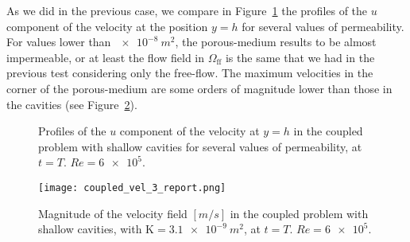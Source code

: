 As we did in the previous case, we compare in Figure~\ref{fig:md_wall_velocities} the profiles of the $u$ component of the velocity at the position $y=h$ for several values of permeability. For values lower than $\SI{e-8}{m^2}$, the porous-medium results to be almost impermeable, or at least the flow field in $\Omega_\text{ff}$ is the 
same that we had in the previous test considering only the free-flow. The maximum velocities in the 
corner of the porous-medium are some orders of magnitude lower than those in 
the cavities (see Figure~\ref{fig:coupled_vel_3}).
\begin{figure}
	\centering
	
	\caption[Profiles of the $u$ component of the velocity at $y=h$ in the coupled problem with shallow cavities]{Profiles of the $u$ component of the velocity at $y=h$ in the coupled problem with shallow cavities for several values of permeability, at $t=T$. $Re = \num{6e5}$.}
	\label{fig:md_wall_velocities}
\end{figure}
\begin{figure}
	\centering
	\texttt{[image: coupled\_vel\_3\_report.png]}
	\caption[Magnitude of the velocity field in the coupled problem with shallow cavities]{Magnitude of the velocity field $[\si{m/s}]$ in the coupled problem with shallow cavities, with $\mathrm{K}=\SI{3.1e-9}{m^2}$, at $t=T$. $Re=\num{6e5}$.}
	\label{fig:coupled_vel_3}
\end{figure}

